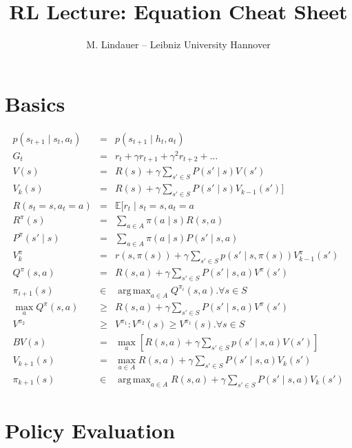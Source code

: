 \documentclass[]{article}
\title{RL Lecture: Equation Cheat Sheet}
\author{M. Lindauer -- Leibniz University Hannover}
\date{}
\DeclareMathOperator*{\argmax}{arg\,max}
\begin{document}
\maketitle

\section{Basics}

\begin{eqnarray}
	 p(s_{t+1} \mid s_t, a_t) &=& p(s_{t+1} \mid h_t, a_t) \\
	 G_t &=& r_t + \gamma r_{t+1} + \gamma^2 r_{t+2} + \ldots\\
	 V(s) &=& R(s) + \gamma \sum_{s' \in S} P(s'\mid s) V(s')\\
	 V_k(s) &=& R(s) + \gamma \sum_{s' \in S} P(s' \mid s) V_{k-1}(s')]\\
	 R(s_t=s, a_t=a) &=& \mathbb{E}[r_t \mid s_t=s, a_t=a\\
	 R^\pi (s) &=& \sum_{a\in A} \pi(a\mid s ) R(s,a) \\
	 P^\pi (s'\mid s) &=& \sum_{a\in A} \pi(a \mid s) P(s' \mid s,a)\\
	 V^\pi_k  &=& r(s, \pi(s)) + \gamma \sum_{s'\in S} p(s'\mid s, \pi(s)) V_{k-1}^\pi (s')\\
	 Q^\pi(s,a) &=& R(s,a) + \gamma \sum_{s' \in S} P(s' \mid s,a) V^\pi(s')\\
	 \pi_{i+1}(s) &\in& \argmax_{a\in A} Q^{\pi_i} (s,a). \forall s \in S \\
    \max_a Q^\pi(s,a) &\geq& R(s,a) + \gamma \sum_{s' \in S} P(s' \mid s,a) V^\pi(s')\\
    V^{\pi_2} &\geq& V^{\pi_1}: V^{\pi_2}(s) \geq V^{\pi_1}(s). \forall s \in S\\
    BV(s) &=& \max_{a} [ R(s,a) + \gamma \sum_{s' \in S} p(s' \mid s,a)  V(s')  ]\\
    V_{k+1}(s) &=& \max_{a\in A } R(s,a) + \gamma \sum_{s' \in S } P(s' \mid s,a) V_k(s') \\
    \pi_{k+1}(s) &\in& \argmax_{a \in A} R(s,a) + \gamma \sum_{s' \in S} P(s' \mid s,a) V_k(s')
\end{eqnarray}

\newpage
\section{Policy Evaluation}
\end{document}
